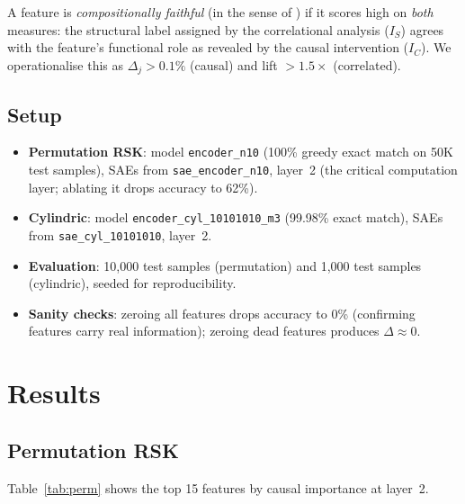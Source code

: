 \documentclass[10pt]{article}
\begin{document}
A feature is \emph{compositionally faithful} (in the sense of
\citet{gauderis2026}) if it scores high on \emph{both} measures: the
structural label assigned by the correlational analysis ($I_S$) agrees with
the feature's functional role as revealed by the causal intervention ($I_C$).
We operationalise this as $\Delta_j > 0.1\%$ (causal) and lift $> 1.5\times$
(correlated).

\subsection{Setup}

\begin{itemize}
\item \textbf{Permutation RSK}: model \texttt{encoder\_n10} (100\% greedy
exact match on 50K test samples), SAEs from
\texttt{sae\_encoder\_n10}, layer~2 (the critical computation layer; ablating
it drops accuracy to 62\%).

\item \textbf{Cylindric}: model \texttt{encoder\_cyl\_10101010\_m3} (99.98\%
exact match), SAEs from \texttt{sae\_cyl\_10101010}, layer~2.

\item \textbf{Evaluation}: 10,000 test samples (permutation) and 1,000 test
samples (cylindric), seeded for reproducibility.

\item \textbf{Sanity checks}: zeroing all features drops accuracy to 0\%
(confirming features carry real information); zeroing dead features produces
$\Delta \approx 0$.
\end{itemize}

\section{Results}

\subsection{Permutation RSK}

Table~\ref{tab:perm} shows the top 15 features by causal importance at
layer~2.
\end{document}
